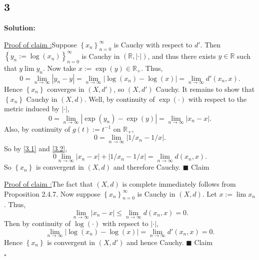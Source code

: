 \documentclass[12pt]{article}
\newcounter{ProofCounter}
\newcounter{ClaimCounter}[ProofCounter]
\newenvironment{Solution}{\stepcounter{ProofCounter}\textbf{Solution:}}{\hfill$\square$}
\newenvironment{claim}[1]{\vspace{1mm}\stepcounter{ClaimCounter}\par\noindent\underline{\bf Claim \theClaimCounter:}\space#1}{}
\newenvironment{claimproof}[1]{\par\noindent\underline{Proof of claim \theClaimCounter:}\space#1}{\hfill $\blacksquare$ Claim \theClaimCounter}
\begin{document}
\subsection*{3}
\begin{Solution}
  \begin{claimproof}
    Suppose $\left\{ x_n \right\}_{n=0}^{\infty}$ is Cauchy with respect to $d'$. Then $\left\{ y_n := \log(x_n) \right\}_{n=0}^{\infty}$ is Cauchy in
    $(\mathbb{R}, |\cdot|)$, and thus there exists $y \in \mathbb{R}$ such that $y \lim y_n$. Now take $x := \exp(y) \in \mathbb{R}_{+}$. Thus,
    \[
      0 = \lim_{n\rightarrow\infty}|y_n - y| = \lim_{n\rightarrow \infty}|\log(x_n) - \log(x)| = \lim_{n\rightarrow \infty}d'(x_n, x).
    \]
    Hence $\left\{ x_n \right\}$ converges in $(X, d')$, so $(X, d')$ Cauchy. It remains to show that $\left\{ x_n \right\}$ Cauchy in $(X,d)$. Well,
    by continuity of $\exp(\cdot)$ with respect to the metric induced by $|\cdot|$,
    \begin{equation}
      0 = \lim_{n\rightarrow\infty}|\exp(y_n) - \exp(y)| = \lim_{n\rightarrow\infty}|x_n - x|.
      \label{3.1}
    \end{equation}
    Also, by continuity of $g(t) := t^{-1}$ on $\mathbb{R}_{+}$,
    \begin{equation}
      0 = \lim_{n\rightarrow\infty}|1/x_n - 1/x|.
      \label{3.2}
    \end{equation}
    So by \eqref{3.1} and \eqref{3.2},
    \[
      0 \lim_{n\rightarrow\infty}|x_n - x| + |1/x_n - 1/x| = \lim_{n\rightarrow\infty}d(x_n, x).
    \]
    So $\left\{ x_n \right\}$ is convergent in $(X,d)$ and therefore Cauchy.
  \end{claimproof}

  \begin{claimproof}
    The fact that $(X,d)$ is complete immediately follows from Proposition 2.4.7. Now suppose $\left\{ x_n \right\}_{n=0}^{\infty}$ is Cauchy in
    $(X,d)$. Let $x := \lim x_n$. Thus, 
    \[
      \lim_{n\rightarrow\infty}|x_n - x| \leq \lim_{n\rightarrow\infty}d(x_n, x) = 0. 
    \]
    Then by continuity of
    $\log(\cdot)$ with repsect to $|\cdot|$, 
    \[
      \lim_{n\rightarrow\infty}|\log(x_n) - \log(x)| = \lim_{n\rightarrow\infty}d'(x_n,x) = 0.
    \]
    Hence $\left\{ x_n \right\}$ is convergent in $(X, d')$ and hence Cauchy.
  \end{claimproof}


\end{Solution}
\end{document}
